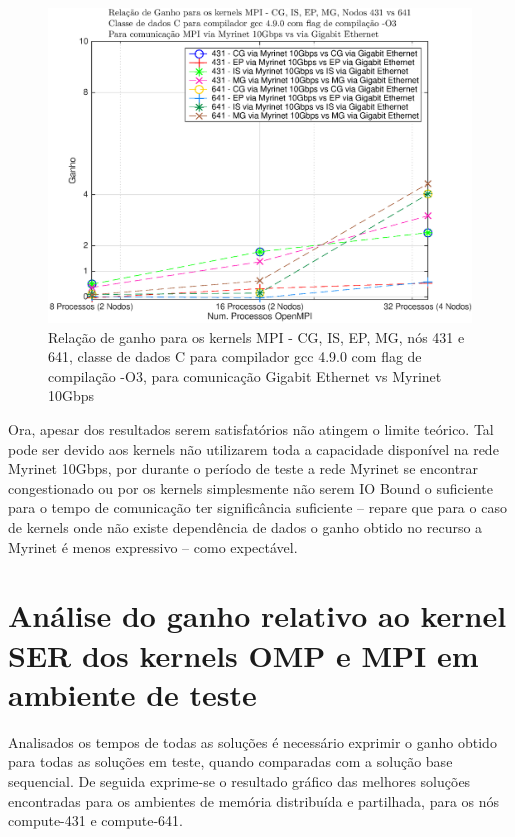 \documentclass[conference,compsoc]{IEEEtran}
\begin{document}
\begin{figure}[H]
\centering
\includegraphics[width=1.1\columnwidth]{EPS/MPI/myri_vs_eth_431_vs_641.eps}
\caption{Relação de ganho para os kernels MPI - CG, IS, EP, MG, nós 431 e 641, classe de dados C para compilador gcc 4.9.0 com flag de compilação  -O3, para comunicação Gigabit Ethernet vs Myrinet 10Gbps}
\label{tempos_641}
\end{figure}

Ora, apesar dos resultados serem satisfatórios não atingem o limite teórico. Tal pode ser devido aos kernels não utilizarem toda a capacidade disponível na rede Myrinet 10Gbps, por durante o período de teste a rede Myrinet se encontrar congestionado ou por os kernels simplesmente não serem IO Bound o suficiente para o tempo de comunicação ter significância suficiente -- repare que para o caso de kernels onde não existe dependência de dados o ganho obtido no recurso a Myrinet é menos expressivo -- como expectável. 

\section{Análise do ganho relativo ao kernel SER dos kernels OMP e MPI em ambiente de  teste}

Analisados os tempos de todas as soluções é necessário exprimir o ganho obtido para todas as soluções em teste, quando comparadas com a solução base sequencial. De seguida exprime-se o resultado gráfico das melhores soluções encontradas para os ambientes de memória distribuída e partilhada, para os nós compute-431 e compute-641.
\end{document}
